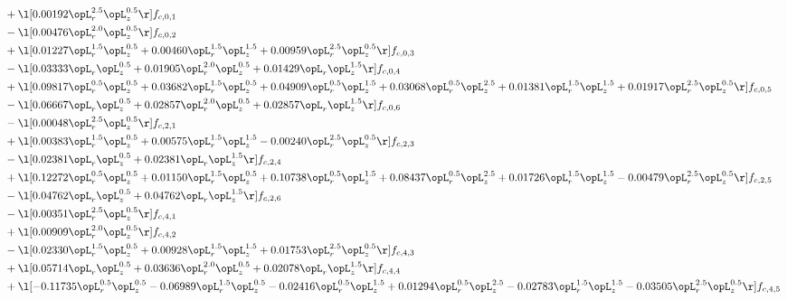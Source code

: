 \begin{alignat}{2}
& + \l[  0.00192 \opL_r^{2.5} \opL_z^{0.5}  \r] f_{c,0,1} \nonumber \\ 
& - \l[  0.00476 \opL_r^{2.0} \opL_z^{0.5}  \r] f_{c,0,2} \nonumber \\ 
& + \l[  0.01227 \opL_r^{1.5} \opL_z^{0.5} +  0.00460 \opL_r^{1.5} \opL_z^{1.5} +  0.00959 \opL_r^{2.5} \opL_z^{0.5}  \r] f_{c,0,3} \nonumber \\ 
& - \l[  0.03333 \opL_r \opL_z^{0.5} +  0.01905 \opL_r^{2.0} \opL_z^{0.5} +  0.01429 \opL_r \opL_z^{1.5}  \r] f_{c,0,4} \nonumber \\ 
& + \l[  0.09817 \opL_r^{0.5} \opL_z^{0.5} +  0.03682 \opL_r^{1.5} \opL_z^{0.5} +  0.04909 \opL_r^{0.5} \opL_z^{1.5} +  0.03068 \opL_r^{0.5} \opL_z^{2.5} +  0.01381 \opL_r^{1.5} \opL_z^{1.5} +  0.01917 \opL_r^{2.5} \opL_z^{0.5}  \r] f_{c,0,5} \nonumber \\ 
& - \l[  0.06667 \opL_r \opL_z^{0.5} +  0.02857 \opL_r^{2.0} \opL_z^{0.5} +  0.02857 \opL_r \opL_z^{1.5}  \r] f_{c,0,6} \nonumber \\ 
& - \l[  0.00048 \opL_r^{2.5} \opL_z^{0.5}  \r] f_{c,2,1} \nonumber \\ 
& + \l[  0.00383 \opL_r^{1.5} \opL_z^{0.5} +  0.00575 \opL_r^{1.5} \opL_z^{1.5}   -0.00240 \opL_r^{2.5} \opL_z^{0.5}  \r] f_{c,2,3} \nonumber \\ 
& - \l[  0.02381 \opL_r \opL_z^{0.5} +  0.02381 \opL_r \opL_z^{1.5}  \r] f_{c,2,4} \nonumber \\ 
& + \l[  0.12272 \opL_r^{0.5} \opL_z^{0.5} +  0.01150 \opL_r^{1.5} \opL_z^{0.5} +  0.10738 \opL_r^{0.5} \opL_z^{1.5} +  0.08437 \opL_r^{0.5} \opL_z^{2.5} +  0.01726 \opL_r^{1.5} \opL_z^{1.5}   -0.00479 \opL_r^{2.5} \opL_z^{0.5}  \r] f_{c,2,5} \nonumber \\ 
& - \l[  0.04762 \opL_r \opL_z^{0.5} +  0.04762 \opL_r \opL_z^{1.5}  \r] f_{c,2,6} \nonumber \\ 
& - \l[  0.00351 \opL_r^{2.5} \opL_z^{0.5}  \r] f_{c,4,1} \nonumber \\ 
& + \l[  0.00909 \opL_r^{2.0} \opL_z^{0.5}  \r] f_{c,4,2} \nonumber \\ 
& - \l[  0.02330 \opL_r^{1.5} \opL_z^{0.5} +  0.00928 \opL_r^{1.5} \opL_z^{1.5} +  0.01753 \opL_r^{2.5} \opL_z^{0.5}  \r] f_{c,4,3} \nonumber \\ 
& + \l[  0.05714 \opL_r \opL_z^{0.5} +  0.03636 \opL_r^{2.0} \opL_z^{0.5} +  0.02078 \opL_r \opL_z^{1.5}  \r] f_{c,4,4} \nonumber \\ 
& + \l[  -0.11735 \opL_r^{0.5} \opL_z^{0.5}   -0.06989 \opL_r^{1.5} \opL_z^{0.5}   -0.02416 \opL_r^{0.5} \opL_z^{1.5} +  0.01294 \opL_r^{0.5} \opL_z^{2.5}   -0.02783 \opL_r^{1.5} \opL_z^{1.5}   -0.03505 \opL_r^{2.5} \opL_z^{0.5}  \r] f_{c,4,5} \nonumber \\ 

\end{alignat}
